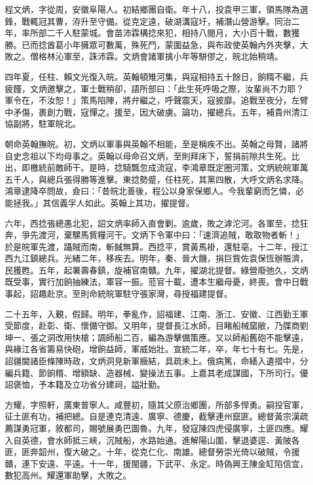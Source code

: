 \begin{pinyinscope}
程文炳，字從周，安徽阜陽人。初結鄉團自衛。年十八，投袁甲三軍，領馬隊為選鋒，戰輒冠其曹，洊升至守備。從克定遠，破湖溝寇圩，補潛山營游擊。同治二年，率所部二千人駐蒙城。會苗沛霖構捻來犯，相持八閱月，大小百十戰，數獲勝。已而捻酋葛小年擁眾可數萬，殊死鬥，蒙圍益急，與布政使英翰內外夾擊，大敗之。僧格林沁軍至，誅沛霖。文炳會諸軍擒小年等駢僇之，皖北始稍靖。

四年夏，任柱、賴文光復入皖。英翰頓雉河集，與寇相持五十餘日，餉糈不繼，兵疲饉，文炳邀擊之，軍士戰稍卻，語所部曰：「此生死呼吸之際，汝輩尚不力耶？軍令在，不汝恕！」策馬陷陣，將弁繼之，呼聲震天，寇披靡。追戰至夜分，左臂中矛傷，裹創力戰，寇憚之。援至，因大破虜。論功，擢總兵。五年，補貴州清江協副將，駐軍皖北。

朝命英翰撫皖。初，文炳以軍事與英翰不相能，至是稱疾不出。英翰之母賢，諸將自史念祖以下均母事之。英翰以母命召文炳，至則拜床下，誓捐前隙共生死。比出，即檄統前敵師干。是時，捻騎飄忽成流寇，李鴻章既定圈河策，文炳統皖軍萬五千人，與總兵張得勝等進擊。東捻勢蹙，任柱死，其黨四散，大呼文炳名求降。鴻章逮降卒問故，僉曰：「昔皖北善後，程公以身家保鄉人。今我輩窮而乞憐，必能拯我。」其信義孚人如此。英翰上其功，擢提督。

六年，西捻張總愚北犯，詔文炳率師入直會剿。逾歲，敗之滹沱河。各軍至，捻狂奔，爭先渡河，棄騾馬貲糧河干。文炳下令軍中曰：「速濟追賊，敢取物者斬！」於是皖軍先渡，躡賊而南，斬馘無算。西捻平，賞黃馬褂，還駐亳。十二年，授江西九江鎮總兵。光緒二年，移疾去。明年，秦、晉大饑，捐巨貲佐袁保恆辦賑濟，民獲甦。五年，起署壽春鎮，旋補官南贛。九年，擢湖北提督。綠營廢弛久，文炳既受事，實行加餉抽練法，軍容一振。蒞官十載，遭本生繼母憂，終喪。會中日戰事起，詔趣赴京。至則命統皖軍駐守張家灣，尋授福建提督。

二十五年，入覲，假歸。明年，拳亂作，詔福建、江南、浙江、安徽、江西勤王軍受節度，赴彰、衛、懷備守御。又明年，提督長江水師，目睹船械窳敝，乃牒商劉坤一、張之洞改用快槍；調師船二百，編為游擊備策應。又以師船舊砲不能擊遠，與緣江各省籌易快砲，增餉益師，軍威始壯。宣統二年，卒，年七十有七。先是，詔疆閫諸臣條陳時政，文炳洞見新軍癥結，具疏未上。俄病篤，命繕入遺摺中，分編兵籍、節餉糈、增額缺、造器械、變操法五事。上嘉其老成謀國，下所司行。優詔褒恤，予本籍及立功省分建祠，謚壯勤。

方耀，字照軒，廣東普寧人。咸豐初，隨其父原治鄉團，所部多悍勇。嗣投官軍，征土匪有功，補把總。自是連克清遠、廣寧、德慶，截擊連州竄匪。總督黃宗漢疏薦謀勇冠軍，敘都司，賜號展勇巴圖魯。九年，發寇陳四虎侵廣寧，土匪四應。耀入自英德，會水師抵三峽，沉賊船，水路始通。進解陽山圍，擊退婆逕、黃陂各匪，匪奔韶州，復大破之。十年，從克仁化、南雄。總督勞崇光倚以破賊，令援贛，連下安遠、平遠。十一年，援閩疆，下武平、永定。時偽興王陳金缸陷信宜，數犯高州。耀還軍助擊，大敗之。


\end{pinyinscope}
